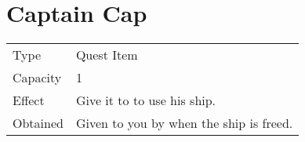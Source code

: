 \section{Captain Cap}
\label{item:captain_cap}


\noindent\begin{tabularx}{\textwidth}[l]{lX}
	Type
	& Quest Item
\\
	Capacity
	& 1
\\
	Effect
	& Give it to \nameref{char:mac} to use his ship.
\\
	Obtained
	& Given to you by \nameref{char:kaeli} when the ship is freed.
\end{tabularx}
